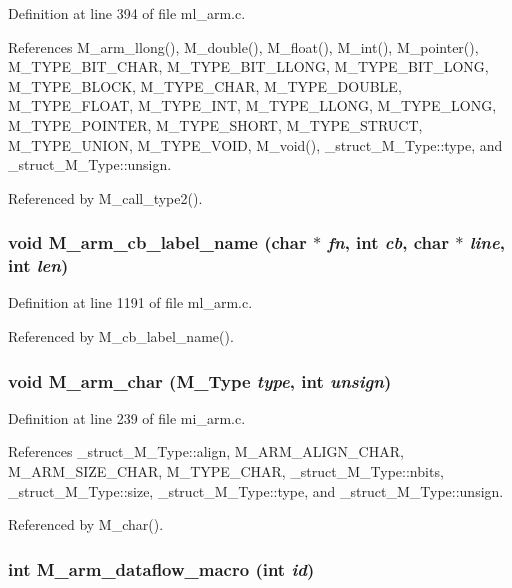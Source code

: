 Definition at line 394 of file ml\_\-arm.c.

References M\_\-arm\_\-llong(), M\_\-double(), M\_\-float(), M\_\-int(), M\_\-pointer(), M\_\-TYPE\_\-BIT\_\-CHAR, M\_\-TYPE\_\-BIT\_\-LLONG, M\_\-TYPE\_\-BIT\_\-LONG, M\_\-TYPE\_\-BLOCK, M\_\-TYPE\_\-CHAR, M\_\-TYPE\_\-DOUBLE, M\_\-TYPE\_\-FLOAT, M\_\-TYPE\_\-INT, M\_\-TYPE\_\-LLONG, M\_\-TYPE\_\-LONG, M\_\-TYPE\_\-POINTER, M\_\-TYPE\_\-SHORT, M\_\-TYPE\_\-STRUCT, M\_\-TYPE\_\-UNION, M\_\-TYPE\_\-VOID, M\_\-void(), \_\-struct\_\-M\_\-Type::type, and \_\-struct\_\-M\_\-Type::unsign.

Referenced by M\_\-call\_\-type2().
\subsubsection{\setlength{\rightskip}{0pt plus 5cm}void M\_\-arm\_\-cb\_\-label\_\-name (char $\ast$ {\em fn}, int {\em cb}, char $\ast$ {\em line}, int {\em len})}\label{m__arm_8h_0d6995ab2feb69e01e4ad53c3f798997}




Definition at line 1191 of file ml\_\-arm.c.

Referenced by M\_\-cb\_\-label\_\-name().
\subsubsection{\setlength{\rightskip}{0pt plus 5cm}void M\_\-arm\_\-char (\bf{M\_\-Type} {\em type}, int {\em unsign})}\label{m__arm_8h_91efb3c3d7b4ed345b47f495fe3cf2a0}




Definition at line 239 of file mi\_\-arm.c.

References \_\-struct\_\-M\_\-Type::align, M\_\-ARM\_\-ALIGN\_\-CHAR, M\_\-ARM\_\-SIZE\_\-CHAR, M\_\-TYPE\_\-CHAR, \_\-struct\_\-M\_\-Type::nbits, \_\-struct\_\-M\_\-Type::size, \_\-struct\_\-M\_\-Type::type, and \_\-struct\_\-M\_\-Type::unsign.

Referenced by M\_\-char().
\subsubsection{\setlength{\rightskip}{0pt plus 5cm}int M\_\-arm\_\-dataflow\_\-macro (int {\em id})}\label{m__arm_8h_b21616dbc759ca85ffe01e545e7850d5}


